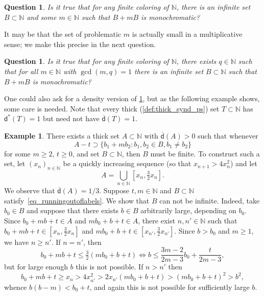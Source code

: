 \documentclass[10pt,dvipsnames]{article}
\newtheorem{question}[theorem]{Question}
\theoremstyle{definition}
\newtheorem{example}[theorem]{Example}
\theoremstyle{plain}
\newcommand{\N}{\mathbb{N}}
\newcommand{\udens}{\overline{\mathsf{d}}}
\newcommand{\ubdens}{\mathsf{d}^*}
\begin{document}
\begin{question}
\label{question_withmultiplicativehints_coloring2}
Is it true that  for any finite coloring of $\N$, there is an infinite set $B \subset \N$ and some $m \in \N$ such that $B+mB$ is monochromatic?
\end{question}

It may be that the set of problematic $m$ is actually small in a multiplicative sense; we make this precise in the next question.

\begin{question}
\label{question_withmultiplicativehints_coloring}
Is it true that for any finite coloring of $\N$, there exists $q\in \N$ such that for all $m\in\N$ with $\gcd(m,q)=1$ there is an infinite set $B\subset \N$ such that  $B+mB$ is monochromatic?
\end{question}

One could also ask for a density version of \cref{question_withmultiplicativehints_coloring2}, but as the following example shows, some care is needed. 
Note that every thick (\cref{def:thick_synd_ps}) set $T \subset \N$ has $\ubdens(T) = 1$ but need not have $\udens(T) = 1$.

\begin{example}\label{example_sparser} 
There exists a thick set $A\subset\N$ with $\udens(A)>0$ such that whenever
\begin{equation}
\label{eq_runningoutoflabels}
A-t\supset\big\{b_1+mb_2:b_1,b_2\in B, b_1\neq b_2\big\}
\end{equation}
for some $m\geq 2$, $t\geq 0$, and set $B\subset\N$, then $B$ must be finite.
To construct such a set, let $(x_n)_{n\in\N}$ be a quickly increasing sequence (so that $x_{n+1}>4x_{n}^2$) and let 
\begin{equation}
    A=\bigcup_{n\in\N}[x_n,\tfrac32x_n].
\end{equation}
We observe that $\udens(A)=1/3$.
Suppose $t,m\in\N$ and $B\subset\N$ satisfy~\eqref{eq_runningoutoflabels}. 
We show that $B$ can not be infinite.
Indeed, take $b_0\in B$ and suppose that there exists $b\in B$ arbitrarily large, depending on $b_0$.
Since $b_0+mb+t\in A$ and $mb_0+b+t\in A$, there exist $n,n'\in\N$ such that $b_0+mb+t\in[x_n,\tfrac32x_n]$ and $mb_0+b+t\in[x_{n'},\tfrac32x_{n'}]$.
Since $b>b_0$ and $m\geq1$, we have $n\geq{n'}$.
If $n={n'}$, then 
$$b_0+mb+t\leq\tfrac32(mb_0+b+t)\iff b\leq\frac{3m-2}{2m-3}b_0+\frac{t}{2m-3},$$
but for large enough $b$ this is not possible.
If $n>{n'}$ then 
$$b_0+mb+t\geq x_n>4x_{n'}^2>2x_{n'}(mb_0+b+t)>(mb_0+b+t)^2>b^2,$$
whence $b(b-m)<b_0+t$, and again this is not possible for sufficiently large $b$.
\end{example}
\medskip
\end{document}
